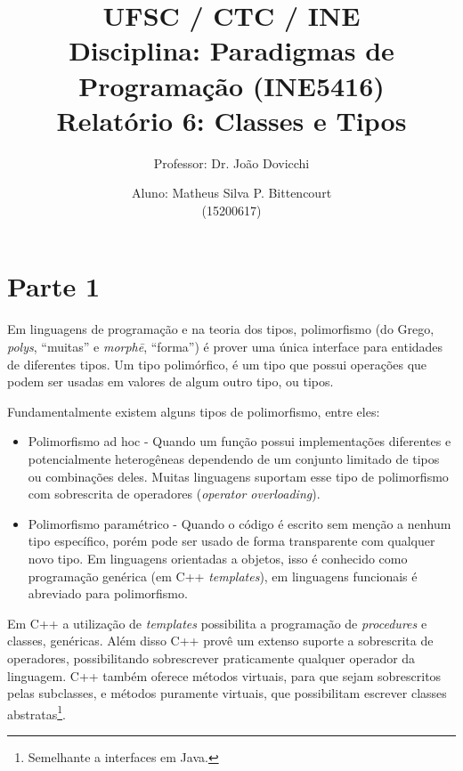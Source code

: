 \documentclass[a4paper,twocolumn,10pt]{article}
\begin{document}
\title{
	\large \rm UFSC / CTC / INE\\
	\large \rm Disciplina: Paradigmas de Programação (INE5416)\\
	\Large \bf Relatório 6: Classes e Tipos
}

\author{
	Professor: Dr. João Dovicchi\\
	\and
	Aluno: Matheus Silva P. Bittencourt\\(15200617)
}

\maketitle

\pagestyle{empty} %

\section*{Parte 1}

Em linguagens de programação e na teoria dos tipos, polimorfismo (do Grego,
\textit{polys}, ``muitas'' e \textit{morphē}, ``forma'') é prover uma única
interface para entidades de diferentes tipos. Um tipo polimórfico, é um tipo
que possui operações que podem ser usadas em valores de algum outro tipo, ou
tipos.

Fundamentalmente existem alguns tipos de polimorfismo, entre eles:

\begin{itemize}

	\item Polimorfismo ad hoc - Quando um função possui implementações
		diferentes e potencialmente heterogêneas dependendo de um conjunto
		limitado de tipos ou combinações deles. Muitas linguagens suportam esse
		tipo de polimorfismo com sobrescrita de operadores (\textit{operator
		overloading}).

	\item Polimorfismo paramétrico - Quando o código é escrito sem menção a
		nenhum tipo específico, porém pode ser usado de forma transparente com
		qualquer novo tipo. Em linguagens orientadas a objetos, isso é
		conhecido como programação genérica (em C++ \textit{templates}), em
		linguagens funcionais é abreviado para polimorfismo.

\end{itemize}

Em C++ a utilização de \textit{templates} possibilita a programação de
\textit{procedures} e classes, genéricas. Além disso C++ provê um extenso
suporte a sobrescrita de operadores, possibilitando sobrescrever praticamente
qualquer operador da linguagem. C++ também oferece métodos virtuais, para que
sejam sobrescritos pelas subclasses, e métodos puramente virtuais, que
possibilitam escrever classes abstratas\footnote{Semelhante a interfaces em
Java.}.
\end{document}
